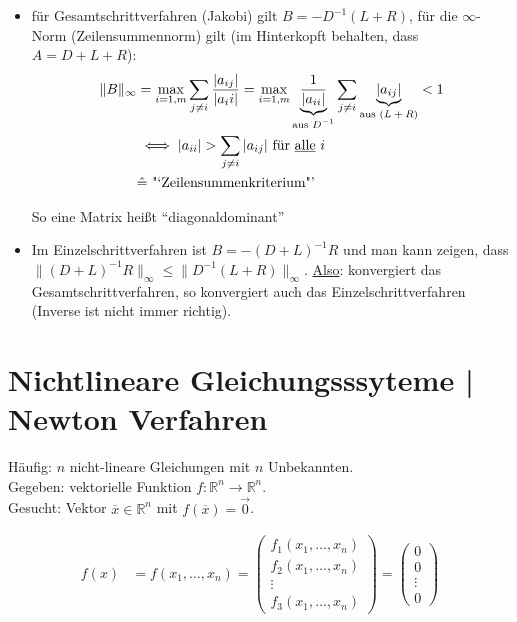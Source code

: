 \documentclass[a4paper,ngerman]{scrbook}
\newcommand{\R}{\ensuremath{\mathbb{R}}}%
\begin{document}
\begin{itemize}
\item für Gesamtschrittverfahren (Jakobi) gilt $B = -D^{-1}(L+R)$, für die $\infty$-Norm (Zeilensummennorm) gilt (im Hinterkopft behalten, dass $A = D+L+R$):
\begin{align*}
  \|B\|_\infty &= \max\limits_{i=1,m} \sum_{j\neq i} \frac{|a_{ij}|}{|a_ii|} = \max\limits_{i=1,m} \underbrace{\frac{1}{|a_{ii}|}}_{\text{aus $D^{-1}$}} \sum_{j\neq i} \underbrace{|a_{ij}|}_{\text{aus $(L+R)$}} < 1\\
&\iff |a_{ii}| > \sum_{j\neq i} |a_{ij}| \text{ für \underline{alle} $i$}\\
&\hat{=} \text{ "`Zeilensummenkriterium"'}
\end{align*}

So eine Matrix heißt "`diagonaldominant"'

\item Im Einzelschrittverfahren ist $B = -(D+L)^{-1} R$ und man kann zeigen, dass $\| (D+L)^{-1} R \|_\infty \leq \|D^{-1} (L+R)\|_\infty$. \underline{Also}: konvergiert das Gesamtschrittverfahren, so konvergiert auch das Einzelschrittverfahren (Inverse ist nicht immer richtig).
\end{itemize}

\section{Nichtlineare Gleichungsssyteme | Newton Verfahren}
\label{sec:nichtlineare}

Häufig: $n$ nicht-lineare Gleichungen mit $n$ Unbekannten.\\
Gegeben: vektorielle Funktion $f\colon \R^n \to \R^n$.\\
Gesucht: Vektor $\overline{x} \in \R^n$ mit $f(\overline{x}) = \vec{0}$.

\begin{align*}
  f(x) &= f(x_1,\dots,x_n) =
  \begin{pmatrix}
    f_1(x_1,\dots,x_n)\\ f_2(x_1,\dots,x_n)\\ \vdots \\ f_3(x_1,\dots,x_n)
  \end{pmatrix} =
  \begin{pmatrix}
    0\\ 0\\ \vdots\\ 0
  \end{pmatrix}
\end{align*}
\end{document}
